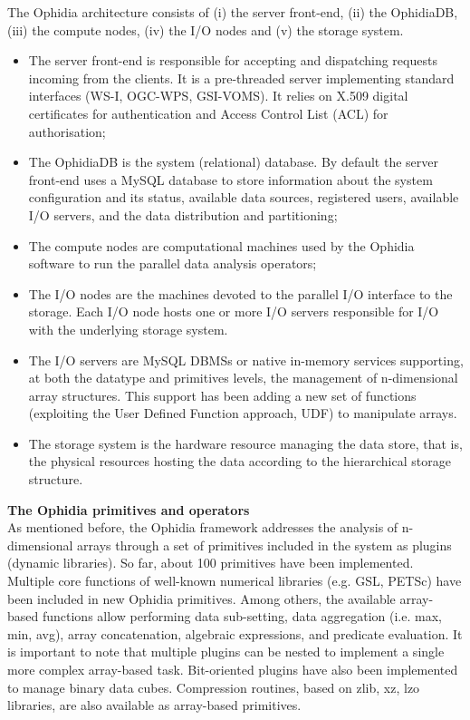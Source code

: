 The Ophidia architecture consists of (i) the server front-end, (ii) the OphidiaDB, (iii) the compute nodes, (iv) the I/O nodes and (v) the storage system.
\begin{itemize}
	\item The server front-end is responsible for accepting and dispatching requests incoming from the clients. It is a pre-threaded server implementing standard interfaces (WS-I, OGC-WPS, GSI-VOMS). It relies on X.509 digital certificates for authentication and Access Control List (ACL) for authorisation;
	\item The OphidiaDB is the system (relational) database. By default the server front-end uses a MySQL database to store information about the system configuration and its status, available data sources, registered users, available I/O servers, and the data distribution and partitioning;
	\item The compute nodes are computational machines used by the Ophidia software to run the parallel data analysis operators;
	\item The I/O nodes are the machines devoted to the parallel I/O interface to the storage. Each I/O node hosts one or more I/O servers responsible for I/O with the underlying storage system. %
	\item The I/O servers are MySQL DBMSs or native in-memory services \cite{DBLP:conf/cd/EliaFDPFW16} supporting, at both the datatype and primitives levels, the management of n-dimensional array structures. This support has been adding a new set of functions (exploiting the User Defined Function approach, UDF) to manipulate arrays.
	\item The storage system is the hardware resource managing the data store, that is, the physical resources hosting the data according to the hierarchical storage structure. %
\end{itemize}

\textbf{The Ophidia primitives and operators}\\

As mentioned before, the Ophidia framework addresses the analysis of n-dimensional arrays through a set of primitives included in the system as plugins (dynamic libraries). So far, about 100 primitives have been implemented. Multiple core functions of well-known numerical libraries (e.g. GSL, PETSc) have been included in new Ophidia primitives. Among others, the available array-based functions allow performing data sub-setting, data aggregation (i.e. max, min, avg), array concatenation, algebraic expressions, and predicate evaluation. It is important to note that multiple plugins can be nested to implement a single more complex array-based task.
Bit-oriented plugins have also been implemented to manage binary data cubes. Compression routines, based on zlib, xz, lzo libraries, are also available as array-based primitives.\\

